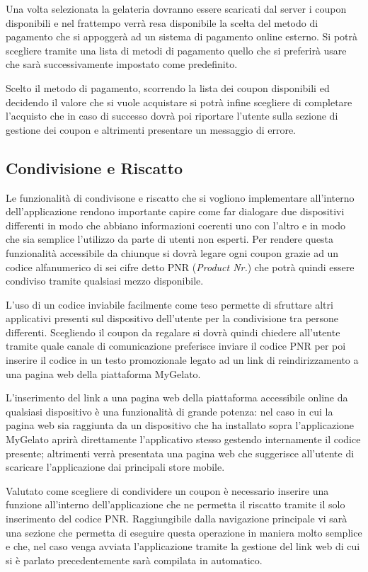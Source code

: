 Una volta selezionata la gelateria dovranno essere scaricati dal server
i coupon disponibili e nel frattempo verrà resa disponibile la scelta
del metodo di pagamento che si appoggerà ad un sistema di pagamento
online esterno. Si potrà scegliere tramite una lista di metodi di
pagamento quello che si preferirà usare che sarà successivamente impostato
come predefinito.

Scelto il metodo di pagamento, scorrendo la lista dei coupon disponibili
ed decidendo il valore che si vuole acquistare si potrà infine scegliere
di completare l'acquisto che in caso di successo dovrà poi riportare
l'utente sulla sezione di gestione dei coupon e altrimenti presentare
un messaggio di errore.

\subsection{Condivisione e Riscatto}

Le funzionalità di condivisone e riscatto che si vogliono implementare
all'interno dell'applicazione rendono importante capire come far dialogare
due dispositivi differenti in modo che abbiano informazioni coerenti
uno con l'altro e in modo che sia semplice l'utilizzo da parte di
utenti non esperti. Per rendere questa funzionalità accessibile da
chiunque si dovrà legare ogni coupon grazie ad un codice alfanumerico
di sei cifre detto PNR (\emph{Product Nr.}) che potrà quindi essere
condiviso tramite qualsiasi mezzo disponibile.\bigskip{}

L'uso di un codice inviabile facilmente come teso permette di sfruttare
altri applicativi presenti sul dispositivo dell'utente per la condivisione
tra persone differenti. Scegliendo il coupon da regalare si dovrà
quindi chiedere all'utente tramite quale canale di comunicazione preferisce
inviare il codice PNR per poi inserire il codice in un testo promozionale
legato ad un link di reindirizzamento a una pagina web della piattaforma
MyGelato.

L'inserimento del link a una pagina web della piattaforma accessibile
online da qualsiasi dispositivo è una funzionalità di grande potenza:
nel caso in cui la pagina web sia raggiunta da un dispositivo che
ha installato sopra l'applicazione MyGelato aprirà direttamente l'applicativo
stesso gestendo internamente il codice presente; altrimenti verrà
presentata una pagina web che suggerisce all'utente di scaricare l'applicazione
dai principali store mobile.\bigskip{}

Valutato come scegliere di condividere un coupon è necessario inserire
una funzione all'interno dell'applicazione che ne permetta il riscatto
tramite il solo inserimento del codice PNR. Raggiungibile dalla navigazione
principale vi sarà una sezione che permetta di eseguire questa operazione
in maniera molto semplice e che, nel caso venga avviata l'applicazione
tramite la gestione del link web di cui si è parlato precedentemente
sarà compilata in automatico.

